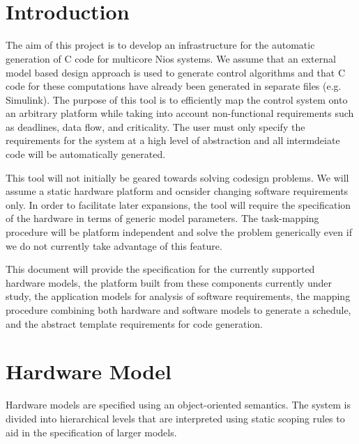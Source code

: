 \documentclass{article}
\title{
\vspace{2in}
\textmd{\textbf{\hmwkTitle}}\\
\vspace{3in}
}
\author{\textbf{\hmwkAuthorName}}
\date{} %
\begin{document}
\maketitle
\thispagestyle{empty}
\newpage
\setcounter{page}{1}

\section{Introduction}

The aim of this project is to develop an infrastructure for the automatic generation of C code for multicore Nios systems. We assume that an external model based design approach is used to generate control algorithms and that C code for these computations have already been generated in separate files (e.g. Simulink). The purpose of this tool is to efficiently map the control system onto an arbitrary platform while taking into account non-functional requirements such as deadlines, data flow, and criticality. The user must only specify the requirements for the system at a high level of abstraction and all intermdeiate code will be automatically generated. 

This tool will not initially be geared towards solving codesign problems. We will assume a static hardware platform and ocnsider changing software requirements only. In order to facilitate later expansions, the tool will require the specification of the hardware in terms of generic model parameters. The task-mapping procedure will be platform independent and solve the problem generically even if we do not currently take advantage of this feature.

This document will provide the specification for the currently supported hardware models, the platform built from these components currently under study, the application models for analysis of software requirements, the mapping procedure combining both hardware and software models to generate a schedule, and the abstract template requirements for code generation.

\section{Hardware Model}
Hardware models are specified using an object-oriented semantics. The system is divided into hierarchical levels that are interpreted using static scoping rules to aid in the specification of larger models. 
\end{document}
